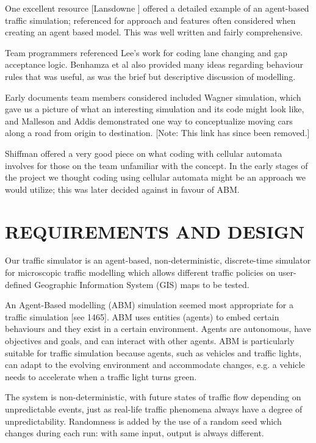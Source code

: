 \documentclass[11pt]{article}
\begin{document}
One excellent resource [Lansdowne\cite{4d} ] offered a detailed example of an agent-based traffic simulation; referenced for approach and features often considered when creating an agent based model. This was well written and fairly comprehensive. 

Team programmers referenced Lee’s\cite{8h} work for coding lane changing and gap acceptance logic. Benhamza et al\cite{6f} also provided many ideas regarding behaviour rules that was useful, as was the brief but descriptive discussion of modelling. 

Early documents team members considered included Wagner\cite{1a} simulation, which gave us a picture of what an interesting simulation and its code might look like, and Malleson and Addis\cite{3c} demonstrated one way to conceptualize moving cars along a road from origin to destination. [Note: This link has since been removed.] 

Shiffman \cite{2b} offered a very good piece on what coding with cellular automata involves for those on the team unfamiliar with the concept. In the early stages of the project we thought coding using cellular automata might be an approach we would utilize; this was later decided against in favour of ABM. 



\section{REQUIREMENTS AND DESIGN}


Our traffic simulator is an agent-based, non-deterministic, discrete-time simulator for microscopic traffic modelling which allows different traffic policies on user-defined Geographic Information System (GIS) maps to be tested. 

An Agent-Based modelling (ABM) simulation seemed most appropriate for a traffic simulation\cite{5e} [see 1465]. ABM uses entities (agents) to embed certain behaviours and they exist in a certain environment. Agents are autonomous, have objectives and goals, and can interact with other agents. ABM is particularly suitable for traffic simulation because agents, such as vehicles and traffic lights, can adapt to the evolving environment and accommodate changes, e.g. a vehicle needs to accelerate when a traffic light turns green.

The system is non-deterministic, with future states of traffic flow depending on unpredictable events, just as real-life traffic phenomena always have a degree of unpredictability. Randomness is added by the use of a random seed which changes during each run: with same input, output is always different. 
\end{document}
